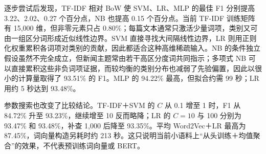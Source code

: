 逐步尝试后发现，TF-IDF 相对 BoW 使 SVM、LR、MLP 的最佳 F1 分别提高 3.22、2.02、0.27 个百分点，NB 也提高 0.15 个百分点。当前 TF-IDF 训练矩阵有 15,000 维，但非零元素只占 0.80\%；每篇文本通常只激活少量词项，类别又可由一组区分词形成近似线性边界。SVM 直接寻找大间隔线性边界，LR 则用正则化权重累积各词项对类别的贡献，因此都适合这种高维稀疏输入。NB 的条件独立假设虽然不完全成立，但新闻主题常由若干高区分度词共同指示；多项式 NB 可以直接累积这些非负词项证据，而较均衡的类别分布也减弱了先验偏置，因此以很小的计算量取得了 93.51\% 的 F1。MLP 的 94.22\% 最高，但拟合约需 99 秒；LR 用约 5 秒达到 93.48\%。

参数搜索也改变了比较结论。TF-IDF＋SVM 的 $C$ 从 0.1 增至 1 时，F1 从 84.72\% 升至 93.23\%，继续增至 10 反而略降；LR 的 $C=10$ 与 100 分别为 93.47\% 和 93.48\%，补查 1,000 后降至 93.35\%。平均 Word2Vec＋LR 最高为 87.45\%，词向量构造另耗时约 213 秒。这只说明当前小语料上“从头训练＋均值聚合”的效果，不代表预训练词向量或 BERT。
